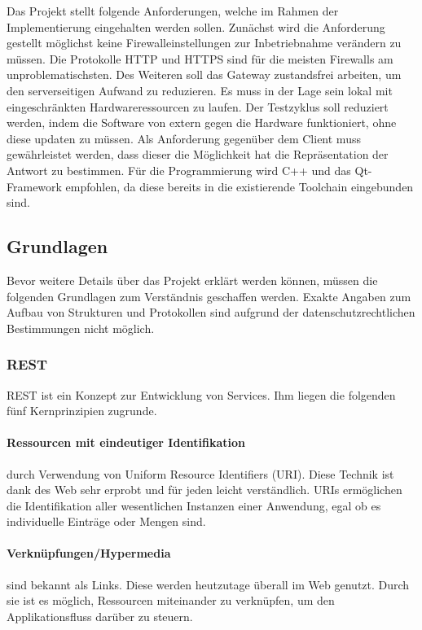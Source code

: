 \documentclass{article}
\begin{document}
Das Projekt stellt folgende Anforderungen, welche im Rahmen der Implementierung eingehalten werden sollen. Zunächst wird die Anforderung gestellt möglichst keine Firewalleinstellungen zur Inbetriebnahme verändern zu müssen. Die Protokolle HTTP und HTTPS sind für die meisten Firewalls am unproblematischsten. Des Weiteren soll das Gateway zustandsfrei arbeiten, um den serverseitigen Aufwand zu reduzieren. Es muss in der Lage sein lokal mit eingeschränkten Hardwareressourcen zu laufen. Der Testzyklus soll reduziert werden, indem die Software von extern gegen die Hardware funktioniert, ohne diese updaten zu müssen. Als Anforderung gegenüber dem Client muss gewährleistet werden, dass dieser die Möglichkeit hat die Repräsentation der Antwort zu bestimmen. Für die Programmierung wird C++ und das Qt-Framework empfohlen, da diese bereits in die existierende Toolchain eingebunden sind.

\subsection{Grundlagen}

Bevor weitere Details über das Projekt erklärt werden können, müssen die folgenden Grundlagen zum Verständnis geschaffen werden. Exakte Angaben zum Aufbau von Strukturen und Protokollen sind aufgrund der datenschutzrechtlichen Bestimmungen nicht möglich.

\subsubsection{REST}

REST ist ein Konzept zur Entwicklung von Services. Ihm liegen die folgenden fünf Kernprinzipien zugrunde.

\paragraph{Ressourcen mit eindeutiger Identifikation}
durch Verwendung von Uniform Resource Identifiers (URI). Diese Technik ist dank des Web sehr erprobt und für jeden leicht verständlich. URIs ermöglichen die Identifikation aller wesentlichen Instanzen einer Anwendung, egal ob es individuelle Einträge oder Mengen sind.

\paragraph{Verknüpfungen/Hypermedia}

sind bekannt als Links. Diese werden heutzutage überall im Web genutzt. Durch sie ist es möglich, Ressourcen miteinander zu verknüpfen, um den Applikationsfluss darüber zu steuern.
\end{document}
